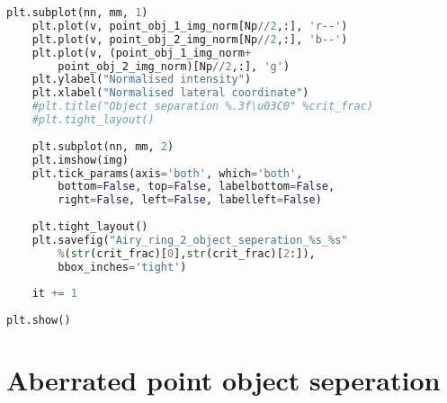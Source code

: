 \begin{lstlisting}[language=Python]
	plt.subplot(nn, mm, 1)
	plt.plot(v, point_obj_1_img_norm[Np//2,:], 'r--')
	plt.plot(v, point_obj_2_img_norm[Np//2,:], 'b--')
	plt.plot(v, (point_obj_1_img_norm+
		point_obj_2_img_norm)[Np//2,:], 'g')
	plt.ylabel("Normalised intensity")
	plt.xlabel("Normalised lateral coordinate")
	#plt.title("Object separation %.3f\u03C0" %crit_frac)
	#plt.tight_layout()
	
	plt.subplot(nn, mm, 2)
	plt.imshow(img)
	plt.tick_params(axis='both', which='both', 
		bottom=False, top=False, labelbottom=False, 
		right=False, left=False, labelleft=False)
	
	plt.tight_layout()
	plt.savefig("Airy_ring_2_object_seperation_%s_%s" 
		%(str(crit_frac)[0],str(crit_frac)[2:]), 
		bbox_inches='tight')
	
	it += 1
	
plt.show()
\end{lstlisting}

\section{Aberrated point object seperation}
\label{sec:aberrated_po_sep_code}

